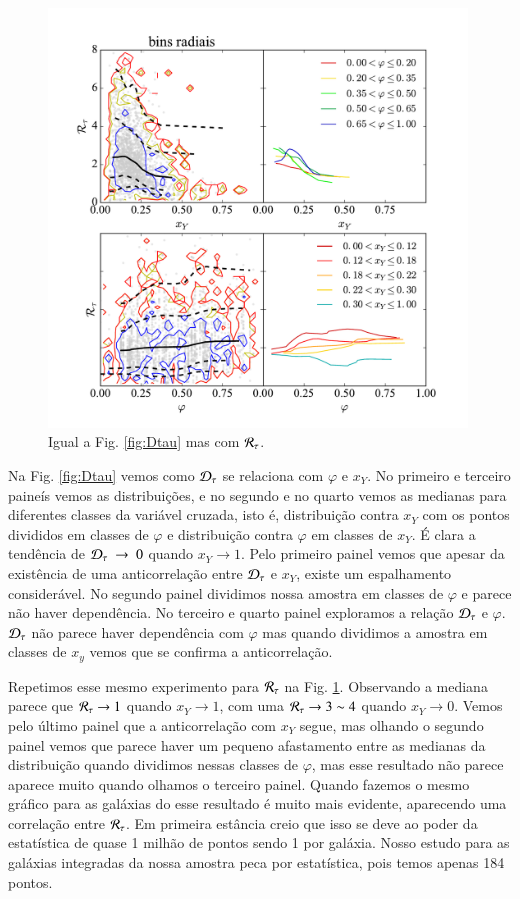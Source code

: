 \begin{figure}
	\centering
	\includegraphics[width=0.99\textwidth]{figuras/RtauR.pdf}
	\caption[$\Rtau$, $x_Y$ e $\varphi$.]
	{Igual a Fig. \ref{fig:Dtau} mas com $\Rtau$.}
	\label{fig:Rtau}
\end{figure}

Na Fig. \ref{fig:Dtau} vemos como $\mathcal{D}_\tau$ se relaciona com $\varphi$ e $x_Y$. No primeiro e
terceiro paineís vemos as distribuições, e no segundo e no quarto vemos as medianas para diferentes
classes da variável cruzada, isto é, distribuição contra $x_Y$ com os pontos divididos em classes de
$\varphi$ e distribuição contra $\varphi$ em classes de $x_Y$. É clara a tendência de $\mathcal{D}_\tau\ \to\
0$ quando $x_Y \to 1$. Pelo primeiro painel vemos que apesar da existência de uma anticorrelação
entre $\mathcal{D}_\tau$ e $x_Y$, existe um espalhamento considerável. No segundo painel dividimos nossa
amostra em classes de $\varphi$ e parece não haver dependência. No terceiro e quarto painel
exploramos a relação $\mathcal{D}_\tau$ e $\varphi$. $\mathcal{D}_\tau$ não parece haver dependência com $\varphi$ mas
quando dividimos a amostra em classes de $x_y$ vemos que se confirma a anticorrelação.

Repetimos esse mesmo experimento para $\Rtau$ na Fig. \ref{fig:Rtau}. Observando a mediana parece
que $\mathcal{R}_\tau \to 1$ quando $x_Y \to 1$, com uma $\mathcal{R}_\tau \to 3 \sim 4$ quando $x_Y \to 0$. Vemos pelo
último painel que a anticorrelação com $x_Y$ segue, mas olhando o segundo painel vemos que parece
haver um pequeno afastamento entre as medianas da distribuição quando dividimos nessas classes de
$\varphi$, mas esse resultado não parece aparece muito quando olhamos o terceiro painel. Quando
fazemos o mesmo gráfico para as galáxias do \SDSS esse resultado é muito mais evidente, aparecendo
uma correlação entre $\Rtau$. Em primeira estância creio que isso se deve ao poder da estatística de
quase 1 milhão de pontos sendo 1 por galáxia. Nosso estudo para as galáxias integradas da nossa
amostra peca por estatística, pois temos apenas 184 pontos.

